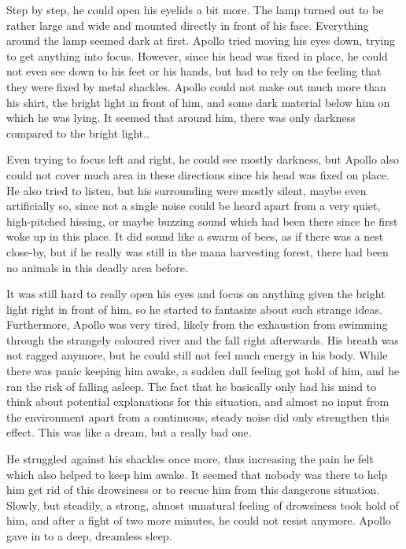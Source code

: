 Step by step, he could open his eyelids a bit more. The lamp turned out to be rather large and wide and mounted directly in front of his face. Everything around the lamp seemed dark at first. Apollo tried moving his eyes down, trying to get anything into focus. However, since his head was fixed in place, he could not even see down to his feet or his hands, but had to rely on the feeling that they were fixed by metal shackles. Apollo could not make out much more than his shirt, the bright light in front of him, and some dark material below him on which he was lying. It seemed that around him, there was only darkness compared to the bright light..

Even trying to focus left and right, he could see mostly darkness, but Apollo also could not cover much area in these directions since his head was fixed on place. He also tried to listen, but his surrounding were mostly silent, maybe even artificially so, since not a single noise could be heard apart from a very quiet, high-pitched hissing, or maybe buzzing sound which had been there since he first woke up in this place. It did sound like a swarm of bees, as if there was a nest close-by, but if he really was still in the mana harvesting forest, there had been no animals in this deadly area before. 

It was still hard to really open his eyes and focus on anything given the bright light right in front of him, so he started to fantasize about such strange ideas. Furthermore, Apollo was very tired, likely from the exhaustion from swimming through the strangely coloured river and the fall right afterwards. His breath was not ragged anymore, but he could still not feel much energy in his body. While there was panic keeping him awake, a sudden dull feeling got hold of him, and he ran the risk of falling asleep. The fact that he basically only had his mind to think about potential explanations for this situation, and almost no input from the environment apart from a continuous, steady noise did only strengthen this effect. This was like a dream, but a really bad one.

He struggled against his shackles once more, thus increasing the pain he felt which also helped to keep him awake. It seemed that nobody was there to help him get rid of this drowsiness or to rescue him from this dangerous situation. Slowly, but steadily, a strong, almost unnatural feeling of drowsiness took hold of him, and after a fight of two more minutes, he could not resist anymore. Apollo gave in to a deep, dreamless sleep.

